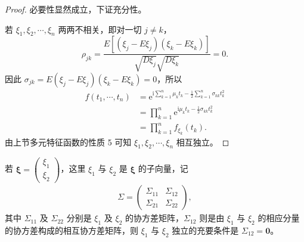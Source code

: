 \documentclass[../../main.tex]{subfiles}
\begin{document}
\begin{proof}
必要性显然成立，下证充分性。

若 $\xi_1,\xi_2,\cdots,\xi_n$ 两两不相关，即对一切 $j\neq k$，
\[
\rho_{jk}=\frac{E[(\xi_j-E\xi_j)(\xi_k-E\xi_k)]}{\sqrt{D\xi_j}\sqrt{D\xi_k}}=0.
\]
因此 $\sigma_{jk}=E(\xi_j-E\xi_j)(\xi_k-E\xi_k)=0$，所以
\begin{align*}
f(t_1,\cdots,t_n)&=\mathrm{e}^{\mathrm{i}\sum_{k=1}^n\mu_k t_k-\frac12\sum_{k=1}^n\sigma_{kk}t_k^2}\\
&=\prod_{k=1}^n\mathrm{e}^{\mathrm{i}\mu_k t_k-\frac12\sigma_{kk}t_k^2}\\
&=\prod_{k=1}^n f_{\xi_k}(t_k).
\end{align*}
由上节多元特征函数的性质 5 可知 $\xi_1,\xi_2,\cdots,\xi_n$ 相互独立。
\end{proof}

\begin{theorem}[子向量独立的充要条件]\label{theorem:ch04-子向量独立}
若 $\boldsymbol{\xi}=\begin{pmatrix}\xi_1\\\xi_2\end{pmatrix}$，这里 $\xi_1$ 与 $\xi_2$ 是 $\boldsymbol{\xi}$ 的子向量，记
\begin{align}
\Sigma=\begin{pmatrix}\Sigma_{11}&\Sigma_{12}\\\Sigma_{21}&\Sigma_{22}\end{pmatrix},\label{align:ch04-分块协方差}
\end{align}
其中 $\Sigma_{11}$ 及 $\Sigma_{22}$ 分别是 $\xi_1$ 及 $\xi_2$ 的协方差矩阵，$\Sigma_{12}$ 则是由 $\xi_1$ 与 $\xi_2$ 的相应分量的协方差构成的相互协方差矩阵，则 $\xi_1$ 与 $\xi_2$ 独立的充要条件是 $\Sigma_{12}=\boldsymbol{0}$。
\end{theorem}
\end{document}
